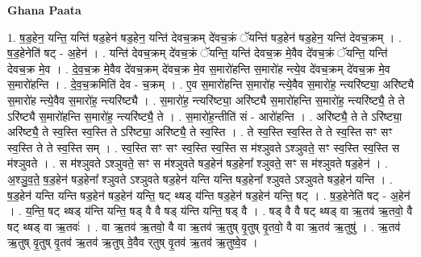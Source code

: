 \documentclass[17pt]{extarticle}
\begin{document}
\textbf{Ghana Paata } \newline

1. ष॒ड॒हेन॒ यन्ति॒ यन्ति॑ षड॒हेन॑ षड॒हेन॒ यन्ति॑ देवच॒क्रम् दे॑वच॒क्रं ॅयन्ति॑ षड॒हेन॑ षड॒हेन॒ यन्ति॑ देवच॒क्रम् । . ष॒ड॒हेनेति॑ षट् - अ॒हेन॑ । . यन्ति॑ देवच॒क्रम् दे॑वच॒क्रं ॅयन्ति॒ यन्ति॑ देवच॒क्र मे॒वैव दे॑वच॒क्रं ॅयन्ति॒ यन्ति॑ देवच॒क्र मे॒व । . दे॒व॒च॒क्र मे॒वैव दे॑वच॒क्रम् दे॑वच॒क्र मे॒व स॒मारो॑हन्ति स॒मारो॑ह न्त्ये॒व दे॑वच॒क्रम् दे॑वच॒क्र मे॒व स॒मारो॑हन्ति । . दे॒व॒च॒क्रमिति॑ देव - च॒क्रम् । . ए॒व स॒मारो॑हन्ति स॒मारो॑ह न्त्ये॒वैव स॒मारो॑ह॒ न्त्यरि॑ष्ट्या॒ अरि॑ष्ट्यै स॒मारो॑ह न्त्ये॒वैव स॒मारो॑ह॒ न्त्यरि॑ष्ट्यै । . स॒मारो॑ह॒ न्त्यरि॑ष्ट्या॒ अरि॑ष्ट्यै स॒मारो॑हन्ति स॒मारो॑ह॒ न्त्यरि॑ष्ट्यै॒ ते ते ऽरि॑ष्ट्यै स॒मारो॑हन्ति स॒मारो॑ह॒ न्त्यरि॑ष्ट्यै॒ ते । . स॒मारो॑ह॒न्तीति॑ सं - आरो॑हन्ति । . अरि॑ष्ट्यै॒ ते ते ऽरि॑ष्ट्या॒ अरि॑ष्ट्यै॒ ते स्व॒स्ति स्व॒स्ति ते ऽरि॑ष्ट्या॒ अरि॑ष्ट्यै॒ ते स्व॒स्ति । . ते स्व॒स्ति स्व॒स्ति ते ते स्व॒स्ति सꣳ सꣳ स्व॒स्ति ते ते स्व॒स्ति सम् । . स्व॒स्ति सꣳ सꣳ स्व॒स्ति स्व॒स्ति स म॑श्ञुवते ऽश्ञुवते॒ सꣳ स्व॒स्ति स्व॒स्ति स म॑श्ञुवते । . स म॑श्ञुवते ऽश्ञुवते॒ सꣳ स म॑श्ञुवते षड॒हेन॑ षड॒हेना᳚ श्ञुवते॒ सꣳ स म॑श्ञुवते षड॒हेन॑ । . अ॒श्ञु॒व॒ते॒ ष॒ड॒हेन॑ षड॒हेना᳚ श्ञुवते ऽश्ञुवते षड॒हेन॑ यन्ति यन्ति षड॒हेना᳚ श्ञुवते ऽश्ञुवते षड॒हेन॑ यन्ति । . ष॒ड॒हेन॑ यन्ति यन्ति षड॒हेन॑ षड॒हेन॑ यन्ति॒ षट् थ्षड् य॑न्ति षड॒हेन॑ षड॒हेन॑ यन्ति॒ षट् । . ष॒ड॒हेनेति॑ षट् - अ॒हेन॑ । . य॒न्ति॒ षट् थ्षड् य॑न्ति यन्ति॒ षड् वै वै षड् य॑न्ति यन्ति॒ षड् वै । . षड् वै वै षट् थ्षड् वा ऋ॒तव॑ ऋ॒तवो॒ वै षट् थ्षड् वा ऋ॒तवः॑ । . वा ऋ॒तव॑ ऋ॒तवो॒ वै वा ऋ॒तव॑ ऋ॒तुष् वृ॒तुष् वृ॒तवो॒ वै वा ऋ॒तव॑ ऋ॒तुषु॑ । . ऋ॒तव॑ ऋ॒तुष् वृ॒तुष् वृ॒तव॑ ऋ॒तव॑ ऋ॒तुष् वे॒वैव र्‌तुष् वृ॒तव॑ ऋ॒तव॑ ऋ॒तुष्वे॒व । \newline
\end{document}
